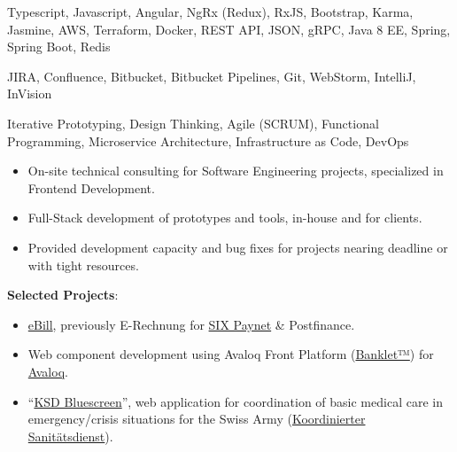 \medskip
\begin{description}
	\ifincludestech
	\item [Technologies] Typescript, Javascript, Angular, NgRx (Redux), RxJS, Bootstrap, Karma, Jasmine, AWS, Terraform, Docker, REST API, JSON, gRPC, Java 8 EE, Spring, Spring Boot, Redis
	\fi
	\ifincludestools
	\item [Tools] JIRA, Confluence, Bitbucket, Bitbucket Pipelines, Git, WebStorm, IntelliJ, InVision
	\fi
	\ifincludesmethods
	\item [Methodologies] Iterative Prototyping, Design Thinking, Agile (SCRUM), Functional Programming, Microservice Architecture, Infrastructure as Code, DevOps
	\fi
\end{description}

\divider


\medskip
\begin{itemize}
	\item On-site technical consulting for Software Engineering projects, specialized in Frontend Development.
	\item Full-Stack development of prototypes and tools, in-house and for clients.
	\item Provided development capacity and bug fixes for projects nearing deadline or with tight resources.
\end{itemize}

\ifincludesselectedprojects
	\smallskip
	\textbf{Selected Projects}:
	\smallskip
	\begin{itemize}
		\item \href{https://www.ebill.ch/}{eBill}, previously E-Rechnung for \href{https://www.six-group.com/en/site/banking-services/paynet.html}{SIX Paynet} \& Postfinance.
		\item Web component development using Avaloq Front Platform (\href{https://developer.avaloq.com/web/developer-portal/learn}{Banklet™}) for \href{https://www.avaloq.com/en/}{Avaloq}.
		\item \enquote{\href{https://blog.alertswiss.ch/de/rubriken/bevoelkerungsschutz/koordinierter-sanitaetsdienst-ksd-neues-management-tool-blue-screen-switzerland/}{KSD Bluescreen}}, web application for coordination of basic medical care in emergency/crisis situations for the Swiss Army (\href{https://www.vtg.admin.ch/de/organisation/astab/san/ksd.html}{Koordinierter Sanitätsdienst}).
	\end{itemize}
\fi

